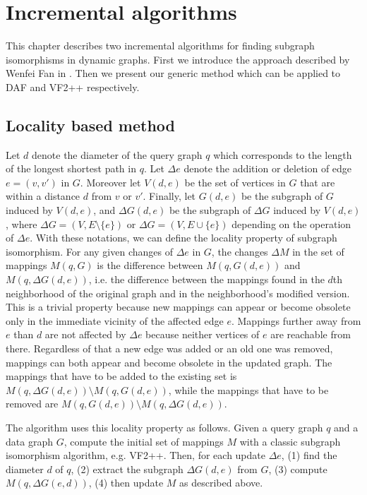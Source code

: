 \chapter{Incremental algorithms}

This chapter describes two incremental algorithms for finding subgraph isomorphisms
in dynamic graphs. First we introduce the approach described by Wenfei Fan in \cite{incrementalpatternmatching}. Then we present
our generic method which can be applied to DAF and VF2++ respectively.



\section{Locality based method}

Let \(d\) denote the diameter of the query graph \(q\) which corresponds to the 
length of the longest shortest path in $q$. Let $\Delta e$ denote the addition or
deletion of edge $e = (v, v')$ in $G$. Moreover let $V(d, e)$ be the set of vertices
in $G$ that are within a distance $d$ from $v$ or $v'$. Finally, let $G(d, e)$
be the subgraph of $G$ induced by $V(d, e)$, and $\Delta G(d, e)$ be the subgraph
of $\Delta G$ induced by $V(d, e)$, where $\Delta G = (V, E \setminus \{e\})$ or
$\Delta G = (V, E \cup \{e\})$ depending on the operation of $\Delta e$. With these
notations, we can define the locality property of subgraph isomorphism. For any 
given changes of $\Delta e$ in $G$, the changes $\Delta M$ in the set of mappings
$M(q, G)$ is the difference between $M(q, G(d, e))$ and $M(q, \Delta G(d, e))$, i.e.
the difference between the mappings found in the $d$th neighborhood of the original graph
and in the neighborhood's modified version. This is a trivial property because new mappings can 
appear or become obsolete only in the immediate vicinity of the affected edge $e$. 
Mappings further away from $e$ than $d$ are not affected by $\Delta e$ because neither 
vertices of $e$ are reachable from there. Regardless of that a new edge was added
or an old one was removed, mappings can both appear and become obsolete in the updated
graph. The mappings that have to be added to the existing set is 
$M(q, \Delta G(d, e)) \setminus M(q, G(d, e))$, while the mappings that have to be
removed are $M(q, G(d, e)) \setminus M(q, \Delta G(d, e))$.

The algorithm uses this locality property as follows. Given a query graph $q$ and a 
data graph $G$, compute the initial set of mappings $M$ with a classic subgraph 
isomorphism algorithm, e.g. VF2++. Then, for each update $\Delta e$, (1) find the 
diameter $d$ of $q$, (2) extract the subgraph $\Delta G(d, e)$ from $G$, (3) compute 
$M(q, \Delta G(e, d))$, (4) then update $M$ as described above.

